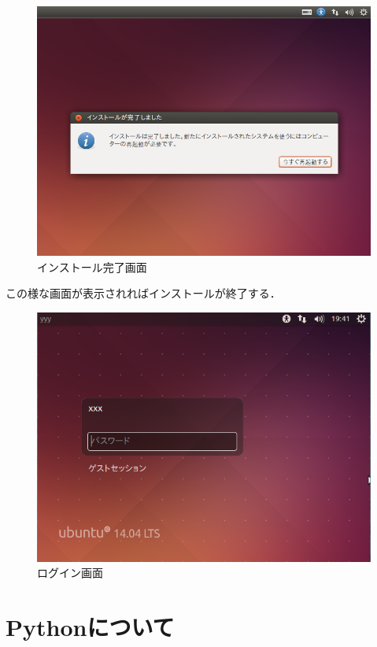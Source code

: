 \begin{figure}[htb]
\centering
\includegraphics[width=15cm]{ubuntuinstall7.png}
\caption{インストール完了画面}\label{イメージ画面}
\end{figure}

この様な画面が表示されればインストールが終了する．


\begin{figure}[htb]
\centering
\includegraphics[width=15cm]{ubuntuinstall8.png}
\caption{ログイン画面}\label{イメージ画面}
\end{figure}
\clearpage


\chapter{Pythonについて}

